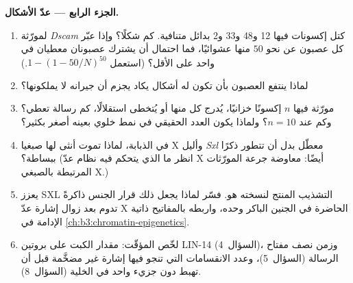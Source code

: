 \begin{problem}
\medskip
\noindent\textbf{الجزء الرابع --- عدّ الأشكال.}
\begin{enumerate}[resume]
  \item لمورّثة \emph{Dscam} كتل إكسونات فيها 12 و48 و33 و2 بدائل متنافية.
        كم شكلًا؟ وإذا عبّر كل عصبون عن نحو $50$ منها عشوائيًا، فما
        احتمال أن يشترك عصبونان معطيان في واحد على الأقل؟ (استعمل
        $1 - (1 -
        50/N)^{50}$.)
  \item لماذا ينتفع العصبون بأن تكون له أشكال يكاد يجزم أن جيرانه
        لا يملكونها؟
  \item مورّثة فيها $n$ إكسونًا خزانيًا، يُدرج كل منها أو يُتخطى
        استقلالًا، كم رسالة تعطي؟ وكم عند $n = 10$؟
        ولماذا يكون العدد الحقيقي في نمط خلوي بعينه أصغر بكثير؟
  \item في الذبابة، لماذا تموت أنثى لها صبغيا X وأليل \emph{Sxl}
        معطّل بدل أن تتطور ذكرًا ببساطة؟ (انظر ما الذي يتحكم فيه
        نظام عدّ X أيضًا: معاوضة جرعة المورّثات المرتبطة بالصبغي X.)
  \item يعزز SXL التشذيب المنتج لنسخته هو. فسّر لماذا يجعل ذلك قرار
        الجنس ذاكرةً تدوم بعد زوال إشارة عدّ X الحاضرة في الجنين
        الباكر وحده، واربطه بالمفاتيح ذاتية الإدامة في
        \cref{ch:b3:chromatin-epigenetics}.
  \item لخّص المؤقّت: مقدار الكبت على بروتين LIN-14
        (السؤال~4)، وزمن نصف مفتاح الرسالة
        (السؤال~5)، وعدد الانقسامات التي تنجو فيها إشارة غير
        مضخَّمة قبل أن تهبط دون جزيء واحد في الخلية
        (السؤال~8).
\end{enumerate}
\end{problem}
